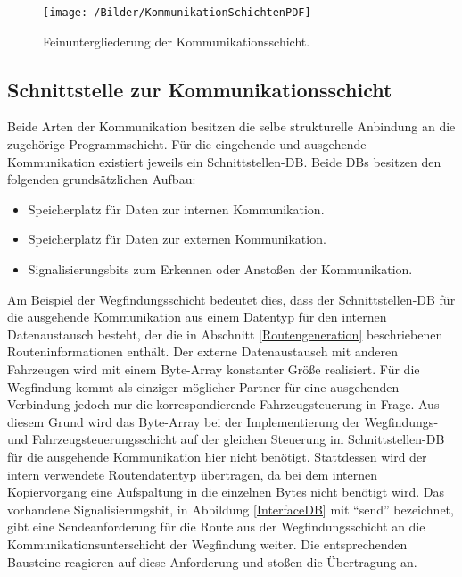 	\begin{figure}[h]
		\centering
		\texttt{[image: /Bilder/KommunikationSchichtenPDF]}
		\vspace{0.2cm}
		\caption{Feinuntergliederung der Kommunikationsschicht.}\label{Kommunikationsschicht Gliederung}
	\end{figure}
	
	\subsection{Schnittstelle zur Kommunikationsschicht}
		
		Beide Arten der Kommunikation besitzen die selbe strukturelle Anbindung an die zugehörige Programmschicht. Für die eingehende und ausgehende Kommunikation existiert jeweils ein Schnittstellen-\ac{DB}. Beide \ac{DB}s besitzen den folgenden grundsätzlichen Aufbau:
		
		\begin{itemize}
			\item Speicherplatz für Daten zur internen Kommunikation.
			\item Speicherplatz für Daten zur externen Kommunikation.
			\item Signalisierungsbits zum Erkennen oder Anstoßen der Kommunikation.
		\end{itemize}
		
		Am Beispiel der Wegfindungsschicht bedeutet dies, dass der Schnittstellen-\ac{DB} für die ausgehende Kommunikation aus einem Datentyp für den internen Datenaustausch besteht, der die in Abschnitt \ref{Routengeneration} beschriebenen Routeninformationen enthält. Der externe Datenaustausch mit anderen Fahrzeugen wird mit einem Byte-Array konstanter Größe realisiert. Für die Wegfindung kommt als einziger möglicher Partner für eine ausgehenden Verbindung jedoch nur die korrespondierende Fahrzeugsteuerung  in Frage. Aus diesem Grund wird das Byte-Array bei der Implementierung der Wegfindungs- und Fahrzeugsteuerungsschicht auf der gleichen Steuerung  im Schnittstellen-\ac{DB} für die ausgehende Kommunikation hier nicht benötigt. Stattdessen wird der intern verwendete Routendatentyp übertragen, da bei dem internen Kopiervorgang eine Aufspaltung in die einzelnen Bytes nicht benötigt wird. Das vorhandene Signalisierungsbit, in Abbildung \ref{InterfaceDB} mit "`send"' bezeichnet, gibt eine Sendeanforderung für die Route aus der Wegfindungsschicht an die Kommunikationsunterschicht der Wegfindung weiter. Die entsprechenden Bausteine reagieren auf diese Anforderung und stoßen die Übertragung an.
		

